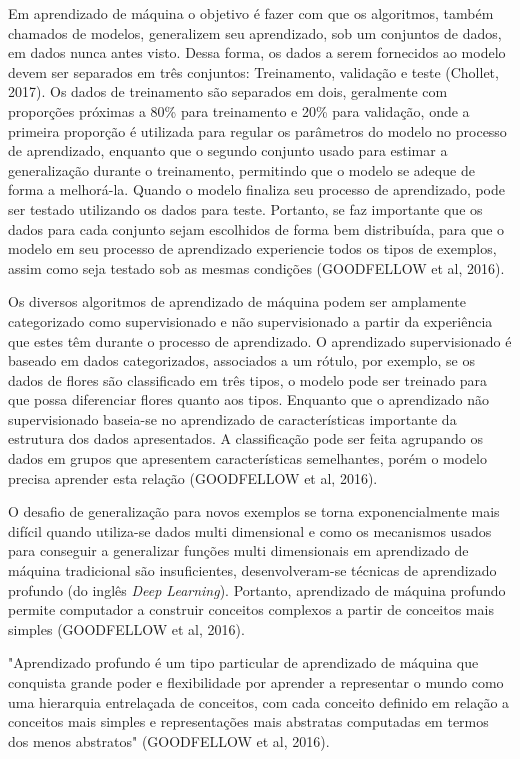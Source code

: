 \documentclass[12pt]{report}
\begin{document}
Em aprendizado de máquina o objetivo é fazer com que os algoritmos, também  chamados de modelos, generalizem seu aprendizado, sob um conjuntos de dados, em dados nunca antes visto. Dessa forma, os dados a serem fornecidos ao modelo devem ser separados em três conjuntos: Treinamento, validação e teste (Chollet, 2017). Os dados de treinamento são separados em dois, geralmente com proporções próximas a 80\% para treinamento e 20\% para validação, onde a primeira proporção é utilizada para regular os parâmetros do modelo no processo de aprendizado, enquanto que o segundo conjunto usado para estimar a generalização durante o treinamento, permitindo que o modelo se adeque de forma a melhorá-la. Quando o modelo finaliza seu processo de aprendizado, pode ser testado utilizando os dados para teste. Portanto, se faz importante que os dados para cada conjunto sejam escolhidos de forma bem distribuída, para que o modelo em seu processo de aprendizado experiencie todos os tipos de exemplos, assim como seja testado sob as mesmas condições (GOODFELLOW et al, 2016).  

Os diversos algoritmos de aprendizado de máquina podem ser amplamente categorizado como supervisionado e não supervisionado a partir da experiência que estes têm durante o processo de aprendizado. O aprendizado supervisionado é baseado em dados categorizados, associados a um rótulo, por exemplo, se os dados de flores são classificado em três tipos, o modelo pode ser treinado para que possa diferenciar flores quanto aos tipos. Enquanto que o aprendizado não supervisionado baseia-se no aprendizado de características importante da estrutura dos dados apresentados. A classificação pode ser feita agrupando os dados em grupos que apresentem características semelhantes, porém o modelo precisa aprender esta relação (GOODFELLOW et al, 2016). 

O desafio de generalização para novos exemplos se torna exponencialmente mais difícil quando utiliza-se dados multi dimensional e como os mecanismos usados para conseguir a generalizar funções multi dimensionais em aprendizado de máquina tradicional são insuficientes, desenvolveram-se técnicas de aprendizado profundo (do inglês \textit{Deep Learning}). Portanto, aprendizado de máquina profundo permite computador a construir conceitos complexos a partir de conceitos mais simples (GOODFELLOW et al, 2016).

"Aprendizado profundo é um tipo particular de aprendizado de máquina que conquista grande poder e flexibilidade por aprender a representar o mundo como uma hierarquia entrelaçada de conceitos, com cada conceito definido em relação a conceitos mais simples e representações mais abstratas computadas em termos dos menos abstratos" (GOODFELLOW et al, 2016).
\end{document}

